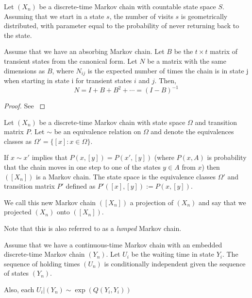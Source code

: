 \begin{theorem}\label{thm:visits_geom}
Let $(X_n)$ be a discrete-time Markov chain with countable state space $S$.
Assuming that we start in a state $s$, the number of visits $s$ is geometrically distributed, with parameter equal to the probability of never returning back to the state.
\end{theorem}

\begin{theorem} \label{thm:fund_exp} \cite{grinstead2003}
Assume that we have an absorbing Markov chain.
Let $B$ be the  $t \times t$ matrix of transient states from the canonical form.
Let $N$ be a matrix with the same dimensions as $B$, where 
$N_{ij}$ is the expected number of times the chain is in state j when starting in state i for transient states $i$ and $j$. Then,
\begin{equation}
    N = I + B + B^2 + \cdots = (I - B)^{-1}
\end{equation}
\end{theorem}

\begin{proof}
See \cite{grinstead2003}
\end{proof}

\begin{theorem}\label{thm:mc_projection} \cite{LevinPeresWilmer2006}
Let $(X_n)$ be a discrete-time Markov chain with state space $\Omega$ and transition matrix $P$.
Let $\sim$ be an equivalence relation on $\Omega$ and denote the equivalences classes as $\Omega' = \{[x]: x \in \Omega\}$.

If $x \sim x'$ implies that $P(x,[y]) = P(x', [y])$ (where $P(x,A)$ is probability that the chain moves in one step to one of the states $y \in A$ from $x$) then $([X_n])$  is a Markov chain.
The state space is the equivalence classes $\Omega'$ and transition matrix $P'$ defined as $P'([x],[y]) := P(x, [y])$.

We call this new Markov chain $([X_n])$ a projection of $(X_n)$ and say that we projected $(X_n)$ onto $([X_n])$.

Note that this is also referred to as a \textit{lumped} Markov chain.
\end{theorem}

\begin{theorem}\label{thm:x_N_indep}
Assume that we have a continuous-time Markov chain with an embedded discrete-time Markov chain $(Y_n)$.
Let $U_i$ be the waiting time in state $Y_i$.
The sequence of holding times $(U_n)$ is conditionally independent given the sequence of states $(Y_n)$.

Also, each $U_i | (Y_n) \sim \exp(Q(Y_i,Y_i))$
\end{theorem}

